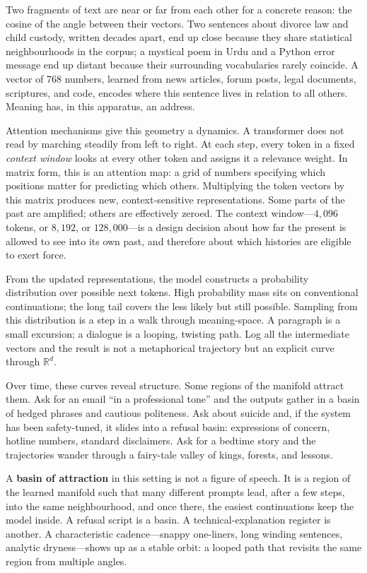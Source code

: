 \documentclass[12pt,a4paper]{article}
\begin{document}
Two fragments of text are near or far from each other for a concrete reason: the cosine of the angle between their vectors. Two sentences about divorce law and child custody, written decades apart, end up close because they share statistical neighbourhoods in the corpus; a mystical poem in Urdu and a Python error message end up distant because their surrounding vocabularies rarely coincide. A vector of 768 numbers, learned from news articles, forum posts, legal documents, scriptures, and code, encodes where this sentence lives in relation to all others. Meaning has, in this apparatus, an address.

Attention mechanisms give this geometry a dynamics. A transformer does not read by marching steadily from left to right. At each step, every token in a fixed \emph{context window} looks at every other token and assigns it a relevance weight. In matrix form, this is an attention map: a grid of numbers specifying which positions matter for predicting which others. Multiplying the token vectors by this matrix produces new, context-sensitive representations. Some parts of the past are amplified; others are effectively zeroed. The context window---$4{,}096$ tokens, or $8{,}192$, or $128{,}000$---is a design decision about how far the present is allowed to see into its own past, and therefore about which histories are eligible to exert force.

From the updated representations, the model constructs a probability distribution over possible next tokens. High probability mass sits on conventional continuations; the long tail covers the less likely but still possible. Sampling from this distribution is a step in a walk through meaning-space. A paragraph is a small excursion; a dialogue is a looping, twisting path. Log all the intermediate vectors and the result is not a metaphorical trajectory but an explicit curve through $\mathbb{R}^d$.

Over time, these curves reveal structure. Some regions of the manifold attract them. Ask for an email ``in a professional tone'' and the outputs gather in a basin of hedged phrases and cautious politeness. Ask about suicide and, if the system has been safety-tuned, it slides into a refusal basin: expressions of concern, hotline numbers, standard disclaimers. Ask for a bedtime story and the trajectories wander through a fairy-tale valley of kings, forests, and lessons.

A \textbf{basin of attraction} in this setting is not a figure of speech. It is a region of the learned manifold such that many different prompts lead, after a few steps, into the same neighbourhood, and once there, the easiest continuations keep the model inside. A refusal script is a basin. A technical-explanation register is another. A characteristic cadence---snappy one-liners, long winding sentences, analytic dryness---shows up as a stable orbit: a looped path that revisits the same region from multiple angles.
\end{document}
